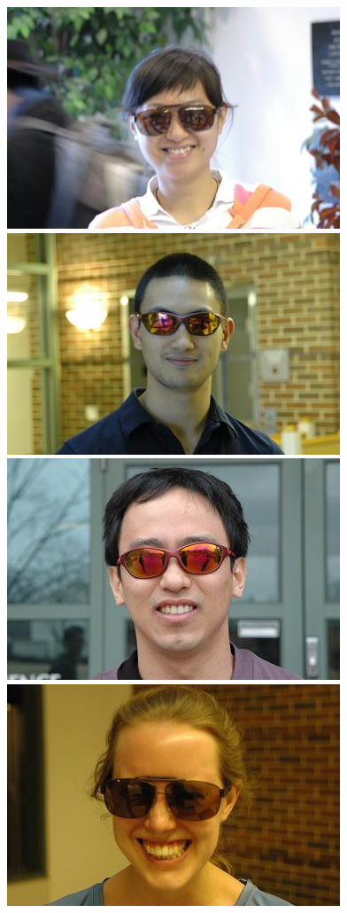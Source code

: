 \documentclass[12pt,journal,draftcls,letterpaper,onecolumn]{IEEEtran}
\begin{document}
\begin{figure}[t]
\includegraphics[scale=0.75,clip=true]{figures_pami/uiuc_example/sunglasses_failed/DSC_3744.JPG}
\includegraphics[scale=0.75,clip=true]{figures_pami/uiuc_example/sunglasses_failed/DSC_3995.JPG}
\includegraphics[scale=0.75,clip=true]{figures_pami/uiuc_example/sunglasses_failed/DSC_4030.JPG}
\includegraphics[scale=0.75,clip=true]{figures_pami/uiuc_example/sunglasses_failed/DSC_4095.JPG}

\end{figure}
\end{document}
